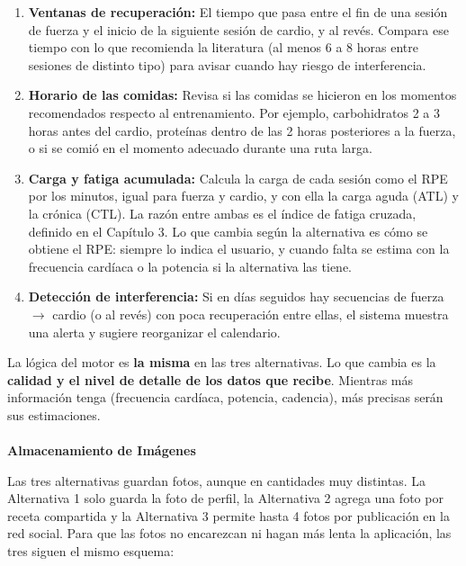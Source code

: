 \begin{enumerate}
    \item \textbf{Ventanas de recuperación:} El tiempo que pasa entre el fin de una sesión de fuerza y el inicio de la siguiente sesión de cardio, y al revés. Compara ese tiempo con lo que recomienda la literatura (al menos 6 a 8 horas entre sesiones de distinto tipo) para avisar cuando hay riesgo de interferencia.
    \item \textbf{Horario de las comidas:} Revisa si las comidas se hicieron en los momentos recomendados respecto al entrenamiento. Por ejemplo, carbohidratos 2 a 3 horas antes del cardio, proteínas dentro de las 2 horas posteriores a la fuerza, o si se comió en el momento adecuado durante una ruta larga.
    \item \textbf{Carga y fatiga acumulada:} Calcula la carga de cada sesión como el RPE por los minutos, igual para fuerza y cardio, y con ella la carga aguda (ATL) y la crónica (CTL). La razón entre ambas es el índice de fatiga cruzada, definido en el Capítulo 3. Lo que cambia según la alternativa es cómo se obtiene el RPE: siempre lo indica el usuario, y cuando falta se estima con la frecuencia cardíaca o la potencia si la alternativa las tiene.
    \item \textbf{Detección de interferencia:} Si en días seguidos hay secuencias de fuerza $\rightarrow$ cardio (o al revés) con poca recuperación entre ellas, el sistema muestra una alerta y sugiere reorganizar el calendario.
\end{enumerate}

La lógica del motor es \textbf{la misma} en las tres alternativas. Lo que cambia es la \textbf{calidad y el nivel de detalle de los datos que recibe}. Mientras más información tenga (frecuencia cardíaca, potencia, cadencia), más precisas serán sus estimaciones.
\\\\
\textbf{Almacenamiento de Imágenes}

Las tres alternativas guardan fotos, aunque en cantidades muy distintas. La Alternativa 1 solo guarda la foto de perfil, la Alternativa 2 agrega una foto por receta compartida y la Alternativa 3 permite hasta 4 fotos por publicación en la red social. Para que las fotos no encarezcan ni hagan más lenta la aplicación, las tres siguen el mismo esquema:

